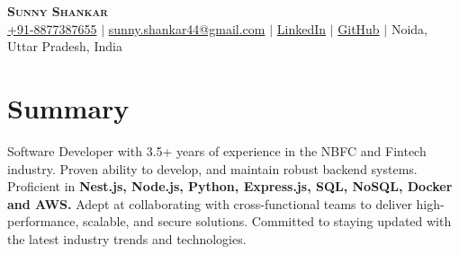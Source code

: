 \documentclass[letterpaper,11pt]{article}
\newcommand{\resumeSubHeadingListStart}{\begin{itemize}[leftmargin=0.15in, label={}]}
\newcommand{\resumeSubHeadingListEnd}{\end{itemize}}
\begin{document}

\begin{center}
    \textbf{\Huge \scshape Sunny Shankar} \\ \vspace{3pt}
    \small
    \faMobile \hspace{.5pt} \href{tel:8877387655}{+91-8877387655}
    $|$
    \faAt \hspace{.5pt} \href{mailto:sunny.shankar44@gmail.com}{sunny.shankar44@gmail.com}
    $|$
    \faLinkedinSquare \hspace{.5pt} \href{https://www.linkedin.com/in/sunny-shankar-587372168/}{LinkedIn}
    $|$
    \faGithub \hspace{.5pt} \href{https://github.com/sunny-shankar}{GitHub}
    $|$
    \faMapMarker \hspace{.5pt} Noida, Uttar Pradesh, India
\end{center}




\section{Summary}
  \vspace{2pt}
  \resumeSubHeadingListStart
   \small{\item{Software Developer with 3.5+ years of experience in the NBFC and Fintech industry. Proven ability to develop, and maintain robust backend systems. Proficient in \textbf{Nest.js, Node.js, Python, Express.js, SQL, NoSQL, Docker and AWS.} Adept at collaborating with cross-functional teams to deliver high-performance, scalable, and secure solutions. Committed to staying updated with the latest industry trends and technologies.
    }}
  \resumeSubHeadingListEnd


\end{document}
